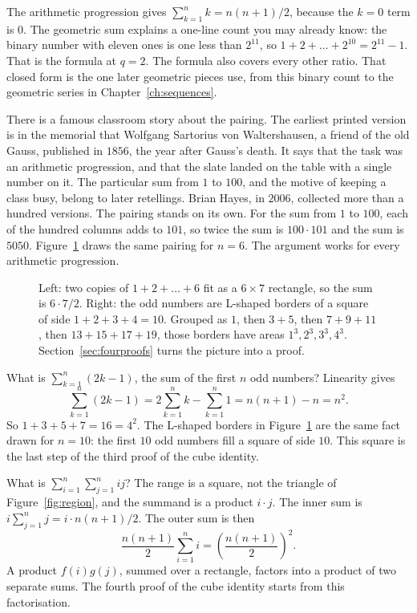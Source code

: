 The arithmetic progression gives $\sum_{k=1}^nk=n(n+1)/2$, because the $k=0$ term is $0$. The geometric sum explains a one-line count you may already know: the binary number with eleven ones is one less than $2^{11}$, so $1+2+\dots+2^{10}=2^{11}-1$. That is the formula at $q=2$. The formula also covers every other ratio. That closed form is the one later geometric pieces use, from this binary count to the geometric series in Chapter~\ref{ch:sequences}.

There is a famous classroom story about the pairing. The earliest printed version is in the memorial that Wolfgang Sartorius von Waltershausen, a friend of the old Gauss, published in $1856$, the year after Gauss's death. It says that the task was an arithmetic progression, and that the slate landed on the table with a single number on it. The particular sum from $1$ to $100$, and the motive of keeping a class busy, belong to later retellings. Brian Hayes, in $2006$, collected more than a hundred versions. The pairing stands on its own. For the sum from $1$ to $100$, each of the hundred columns adds to $101$, so twice the sum is $100\cdot101$ and the sum is $5050$. Figure~\ref{fig:gauss} draws the same pairing for $n=6$. The argument works for every arithmetic progression.

\begin{figure}[ht]
\centering
{}
\caption{Left: two copies of $1+2+\dots+6$ fit as a $6\times7$ rectangle, so the sum is $6\cdot7/2$. Right: the odd numbers are L-shaped borders of a square of side $1+2+3+4=10$. Grouped as $1$, then $3+5$, then $7+9+11$, then $13+15+17+19$, those borders have areas $1^3,2^3,3^3,4^3$. Section~\ref{sec:fourproofs} turns the picture into a proof.}
\label{fig:gauss}
\end{figure}


\begin{examplex}
What is $\sum_{k=1}^n(2k-1)$, the sum of the first $n$ odd numbers? Linearity gives
\[
\sum_{k=1}^n(2k-1)=2\sum_{k=1}^nk-\sum_{k=1}^n1=n(n+1)-n=n^2.
\]
So $1+3+5+7=16=4^2$. The L-shaped borders in Figure~\ref{fig:gauss} are the same fact drawn for $n=10$: the first $10$ odd numbers fill a square of side $10$. This square is the last step of the third proof of the cube identity.

What is $\sum_{i=1}^n\sum_{j=1}^nij$? The range is a square, not the triangle of Figure~\ref{fig:region}, and the summand is a product $i\cdot j$. The inner sum is $i\sum_{j=1}^nj=i\cdot n(n+1)/2$. The outer sum is then
\[
\frac{n(n+1)}{2}\sum_{i=1}^ni=\left(\frac{n(n+1)}{2}\right)^2.
\]
A product $f(i)g(j)$, summed over a rectangle, factors into a product of two separate sums. The fourth proof of the cube identity starts from this factorisation.
\end{examplex}

